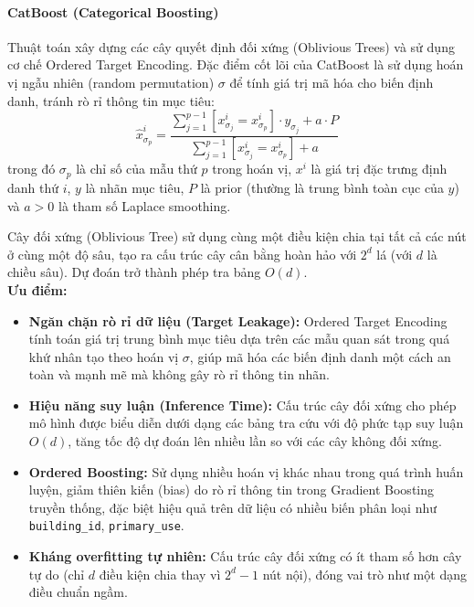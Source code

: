\paragraph{CatBoost (Categorical Boosting)}\hspace{1cm}

Thuật toán xây dựng các cây quyết định đối xứng (Oblivious Trees) và sử dụng cơ chế Ordered Target Encoding. Đặc điểm cốt lõi của CatBoost là sử dụng hoán vị ngẫu nhiên (random permutation) $\sigma$ để tính giá trị mã hóa cho biến định danh, tránh rò rỉ thông tin mục tiêu:
\begin{equation*}
    \hat{x}_{\sigma_p}^i = \frac{\sum_{j=1}^{p-1} [x_{\sigma_j}^i = x_{\sigma_p}^i] \cdot y_{\sigma_j} + a \cdot P}{\sum_{j=1}^{p-1} [x_{\sigma_j}^i = x_{\sigma_p}^i] + a}
\end{equation*}
trong đó $\sigma_p$ là chỉ số của mẫu thứ $p$ trong hoán vị, $x^i$ là giá trị đặc trưng định danh thứ $i$, $y$ là nhãn mục tiêu, $P$ là prior (thường là trung bình toàn cục của $y$) và $a > 0$ là tham số Laplace smoothing.

Cây đối xứng (Oblivious Tree) sử dụng cùng một điều kiện chia tại tất cả các nút ở cùng một độ sâu, tạo ra cấu trúc cây cân bằng hoàn hảo với $2^d$ lá (với $d$ là chiều sâu). Dự đoán trở thành phép tra bảng $O(d)$.\\

\textbf{Ưu điểm:}
\begin{itemize}
    \item \textbf{Ngăn chặn rò rỉ dữ liệu (Target Leakage):} Ordered Target Encoding tính toán giá trị trung bình mục tiêu dựa trên các mẫu quan sát trong quá khứ nhân tạo theo hoán vị $\sigma$, giúp mã hóa các biến định danh một cách an toàn và mạnh mẽ mà không gây rò rỉ thông tin nhãn.
    \item \textbf{Hiệu năng suy luận (Inference Time):} Cấu trúc cây đối xứng cho phép mô hình được biểu diễn dưới dạng các bảng tra cứu với độ phức tạp suy luận $O(d)$, tăng tốc độ dự đoán lên nhiều lần so với các cây không đối xứng.
    \item \textbf{Ordered Boosting:} Sử dụng nhiều hoán vị khác nhau trong quá trình huấn luyện, giảm thiên kiến (bias) do rò rỉ thông tin trong Gradient Boosting truyền thống, đặc biệt hiệu quả trên dữ liệu có nhiều biến phân loại như \texttt{building\_id}, \texttt{primary\_use}.
    \item \textbf{Kháng overfitting tự nhiên:} Cấu trúc cây đối xứng có ít tham số hơn cây tự do (chỉ $d$ điều kiện chia thay vì $2^d - 1$ nút nội), đóng vai trò như một dạng điều chuẩn ngầm.
\end{itemize}

